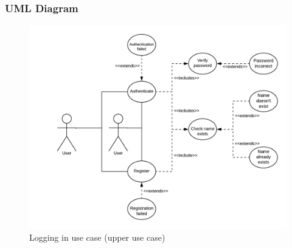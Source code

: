 \documentclass[10pt]{article}
\begin{document}
		\subsubsection{UML Diagram}
			\begin{figure}[H]
				\includegraphics[width=1.1\linewidth]{latex_images/LoginAndRegisterUseCase.png}
				\caption{Logging in use case (upper use case)}
			\end{figure}
\end{document}
